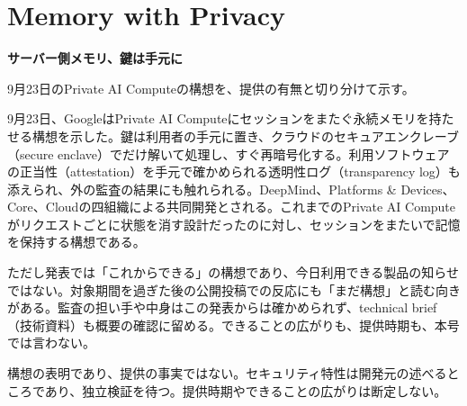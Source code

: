 \section{Memory with Privacy}
\begin{wideflow}
{\Large\bfseries サーバー側メモリ、鍵は手元に}\par
\smallskip
{\color{SurveyMuted}9月23日のPrivate AI Computeの構想を、提供の有無と切り分けて示す。}\par
\end{wideflow}

9月23日、GoogleはPrivate AI Computeにセッションをまたぐ永続メモリを持たせる構想を示した\cite{googlemem}。鍵は利用者の手元に置き、クラウドのセキュアエンクレーブ（secure enclave）でだけ解いて処理し、すぐ再暗号化する。利用ソフトウェアの正当性（attestation）を手元で確かめられる透明性ログ（transparency log）も添えられ、外の監査の結果にも触れられる。DeepMind、Platforms \& Devices、Core、Cloudの四組織による共同開発とされる。これまでのPrivate AI Computeがリクエストごとに状態を消す設計だったのに対し、セッションをまたいで記憶を保持する構想である。

ただし発表では「これからできる」の構想であり、今日利用できる製品の知らせではない。対象期間を過ぎた後の公開投稿での反応にも「まだ構想」と読む向きがある。監査の担い手や中身はこの発表からは確かめられず、technical brief（技術資料）も概要の確認に留める。できることの広がりも、提供時期も、本号では言わない。

\begin{claimboundary}[資料と評価の境界]
構想の表明であり、提供の事実ではない。セキュリティ特性は開発元の述べるところであり、独立検証を待つ。提供時期やできることの広がりは断定しない。
\end{claimboundary}
